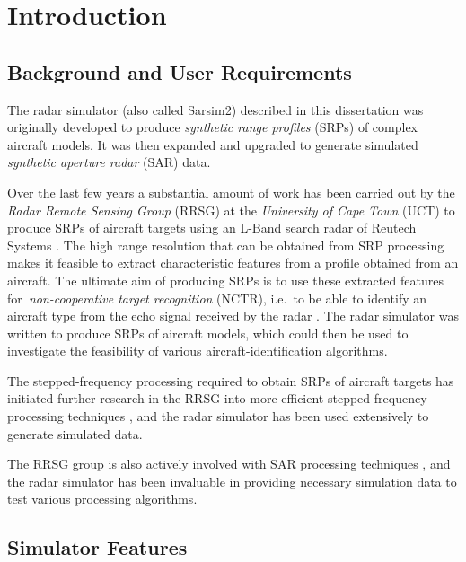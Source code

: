                       

\chapter{Introduction}


\section{Background and User Requirements}

The radar simulator (also called Sarsim2) described in this dissertation was
originally developed to produce \textit{synthetic range profiles} (SRPs) of
complex aircraft models. It was then expanded and upgraded to generate
simulated \textit{synthetic aperture radar} (SAR) data.

Over the last few years a substantial amount of work has been carried out by
the \textit{Radar Remote Sensing Group} (RRSG) at the \textit{University of
Cape Town }(UCT) to produce SRPs of aircraft targets using an L-Band search
radar of Reutech Systems \cite{Inggs:93, Inggs:92b, Richard4, Inggs:92a}.
The high range resolution that can be obtained from SRP processing makes it
feasible to extract characteristic features from a profile obtained from an
aircraft. The ultimate aim of producing SRPs is to use these extracted
features for\textit{\ non-cooperative target recognition} (NCTR), i.e.\ to
be able to identify an aircraft type from the echo signal received by the
radar \cite{Robinson}. The radar simulator was written to produce SRPs of
aircraft models, which could then be used to investigate the feasibility of
various aircraft-identification algorithms.

The stepped-frequency processing required to obtain SRPs of aircraft targets
has initiated further research in the RRSG into more efficient
stepped-frequency processing techniques \cite{Gill, Huang:96, Richard:97b,
Richard:97a, Ulander:98, Wehner}, and the radar simulator has been used
extensively to generate simulated data.

The RRSG group is also actively involved with SAR processing techniques \cite
{Crespo, Cumming, Hughes, Inggs:96, Mittermayer, Moreira:98, Runge}, and the
radar simulator has been invaluable in providing necessary simulation data
to test various processing algorithms.

\section{Simulator Features}

